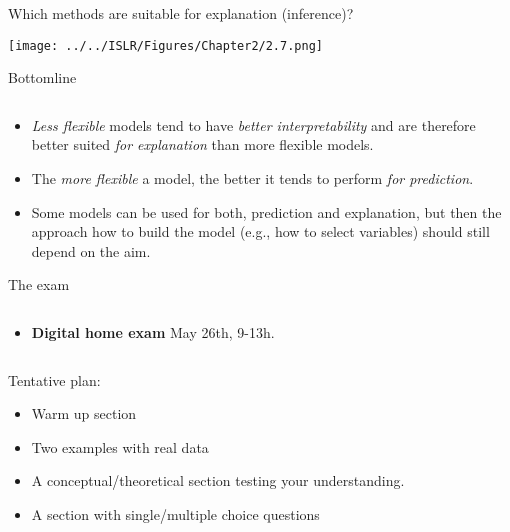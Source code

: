 \documentclass[10pt,ignorenonframetext,]{beamer}
\providecommand{\tightlist}{%
  \setlength{\itemsep}{0pt}\setlength{\parskip}{0pt}}
\begin{document}
\begin{frame}

Which methods are suitable for explanation (inference)? \vspace{-2mm}

\centering

\texttt{[image: ../../ISLR/Figures/Chapter2/2.7.png]}

\end{frame}

\begin{frame}

\begin{block}{Bottomline}

\(~\)

\begin{itemize}
\tightlist
\item
  \emph{Less flexible} models tend to have \emph{better
  interpretability} and are therefore better suited \emph{for
  explanation} than more flexible models.
\end{itemize}

\vspace{2mm}

\begin{itemize}
\tightlist
\item
  The \emph{more flexible} a model, the better it tends to perform
  \emph{for prediction}.
\end{itemize}

\vspace{2mm}

\begin{itemize}
\tightlist
\item
  Some models can be used for both, prediction and explanation, but then
  the approach how to build the model (e.g., how to select variables)
  should still depend on the aim.
\end{itemize}

\end{block}

\end{frame}

\begin{frame}{The exam}
\protect\hypertarget{the-exam}{}

\(~\)

\begin{itemize}
\tightlist
\item
  \textbf{Digital home exam} May 26th, 9-13h.
\end{itemize}

\(~\)

Tentative plan:

\begin{itemize}
\tightlist
\item
  Warm up section
\item
  Two examples with real data
\item
  A conceptual/theoretical section testing your understanding.
\item
  A section with single/multiple choice questions
\end{itemize}

\end{frame}
\end{document}
